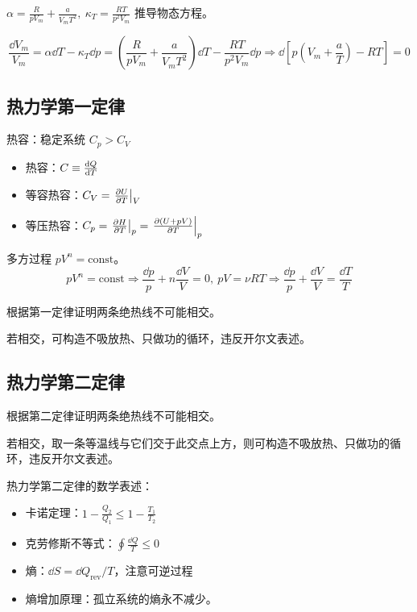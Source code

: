 \begin{framed}
    $\alpha = \frac{R}{p V_m} + \frac{a}{V_m T^2},\ \kappa_T = \frac{R T}{p^2 V_m}$ 推导物态方程。

    \[
        \frac{\dd{V_m}}{V_m} = \alpha \dd{T} - \kappa_T \dd{p} = (\frac{R}{p V_m} + \frac{a}{V_m T^2}) \dd{T} - \frac{R T}{p^2 V_m} \dd{p} \Rightarrow \dd{\left[p \left(V_m + \frac{a}{T}\right) - R T\right]} = 0
    \]
\end{framed}

\subsection{热力学第一定律}

热容：稳定系统 $C_p > C_V$

\begin{itemize}
    \item 热容：$C \equiv \dv{Q}{T}$
    \item 等容热容：$C_V = \left.\pdv{U}{T}\right|_V$
    \item 等压热容：$C_p = \left.\pdv{H}{T}\right|_p = \left.\pdv{(U + pV)}{T}\right|_p$
\end{itemize}

\begin{framed}
    多方过程 $p V^n = \text{const}$。
    \[
        p V^n = \text{const} \Rightarrow \frac{\dd{p}}{p} + n \frac{\dd{V}}{V} = 0,\ p V = \nu R T \Rightarrow \frac{\dd{p}}{p} + \frac{\dd{V}}{V} = \frac{\dd{T}}{T}
    \]
\end{framed}

\begin{framed}
    根据第一定律证明两条绝热线不可能相交。

    若相交，可构造不吸放热、只做功的循环，违反开尔文表述。
\end{framed}

\subsection{热力学第二定律}

\begin{framed}
    根据第二定律证明两条绝热线不可能相交。

    若相交，取一条等温线与它们交于此交点上方，则可构造不吸放热、只做功的循环，违反开尔文表述。
\end{framed}

热力学第二定律的数学表述：
\begin{itemize}
    \item 卡诺定理：$1 - \frac{Q_2}{Q_1} \leq 1 - \frac{T_1}{T_2}$
    \item 克劳修斯不等式：$\oint \frac{\dd{Q}}{T} \leq 0$
    \item 熵：$\dd{S} = \dd{Q_{\text{rev}}} / T$，注意可逆过程
    \item 熵增加原理：孤立系统的熵永不减少。
\end{itemize}

